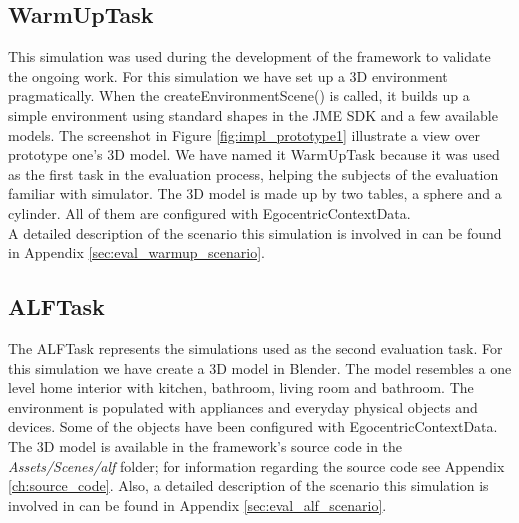 \subsection{WarmUpTask} %
\label{subsec:impl_warmup_task}
This simulation was used during the development of the framework to validate the ongoing work. For this simulation we have set up a 3D environment pragmatically. When the createEnvironmentScene() is called, it builds up a simple environment using standard shapes in the JME SDK and a few available models. The screenshot in Figure \ref{fig:impl_prototype1} illustrate a view over prototype one's 3D model. We have named it WarmUpTask because it was used as the first task in the evaluation process, helping the subjects of the evaluation familiar with simulator. The 3D model is made up by two tables, a sphere and a cylinder. All of them are configured with EgocentricContextData.\\

A detailed description of the scenario this simulation is involved in can be found in Appendix \ref{sec:eval_warmup_scenario}.

\subsection{ALFTask} %
\label{subsec:impl_alf_task}
The ALFTask represents the simulations used as the second evaluation task. For this simulation we have create a 3D model in Blender. The model resembles a one level home interior with kitchen, bathroom, living room and bathroom. The environment is populated with appliances and everyday physical objects and devices. Some of the objects have been configured with EgocentricContextData. The 3D model is available in the framework's source code in the \emph{Assets/Scenes/alf} folder; for information regarding the source code see Appendix \ref{ch:source_code}. Also, a detailed description of the scenario this simulation is involved in can be found in Appendix \ref{sec:eval_alf_scenario}.\\

